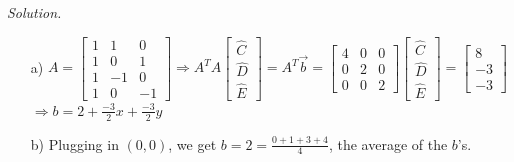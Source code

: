 \documentclass[12pt]{article}
\begin{document}
\begin{itemize}
\textit{Solution.}
\begin{itemize}
\item[a)]  $A=
\left[\begin{array}{crr} 
 1 &  1 &  0 \\
 1 &  0 &  1 \\
 1 & -1 &  0 \\
 1 &  0 & -1
\end{array}\right] \Rightarrow 
A^TA\left[\begin{array}{c} \hat{C} \\ \hat{D} \\ \hat{E} \end{array}\right]=A^T\vec{b} = 
\left[\begin{array}{crr} 
 4 & 0 & 0 \\
 0 & 2 & 0 \\
 0 & 0 & 2
\end{array}\right]\left[\begin{array}{c} \hat{C} \\ \hat{D} \\ \hat{E} \end{array}\right] =
\left[\begin{array}{r} 8 \\ -3 \\ -3 \end{array}\right]$ \\
$\Rightarrow b = 2 + \frac{-3}{2}x+\frac{-3}{2}y$
\item[b)] Plugging in $(0,0)$, we get $b=2 = \frac{0+1+3+4}{4}$, the average of the $b$'s.
\end{itemize}


\end{itemize}
\end{document}
